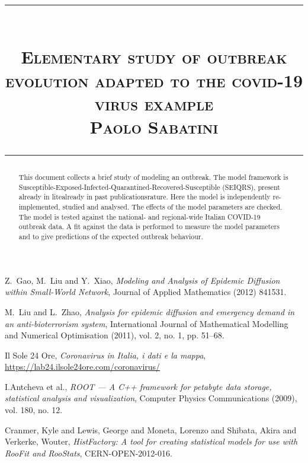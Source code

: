 \documentclass{article}
\title{
\begin{flushleft}
\rule{\textwidth}{1pt}\\
  \textsc{\textbf{Elementary study of outbreak evolution adapted to the covid-19 virus example 	}}\\[2mm]
\textsc{\large Paolo Sabatini}\\
\rule{\textwidth}{1pt}
  \end{flushleft}
}
\date{}
\begin{document}
\maketitle


\begin{abstract}
This document collects a brief study of modeling an outbreak. The model framework is Susceptible-Exposed-Infected-Quarantined-Recovered-Susceptible (SEIQRS), present already in litealready in past publicationsrature. Here the model is independently re-implemented, studied and analysed. The effects of the model parameters are checked. The model is tested against the national- and regional-wide Italian COVID-19 outbreak data. A fit against the data is performed to measure the model parameters and to give predictions of the expected outbreak behaviour.
\end{abstract}
\vspace{2cm}
\tableofcontents

\newpage







\begin{thebibliography}{9}
Z.~Gao, M.~Liu and Y.~Xiao, 
\textit{Modeling and Analysis of Epidemic Diffusion within Small-World Network},
Journal of Applied Mathematics (2012) 841531.

M.~Liu and L.~Zhao, 
\textit{Analysis for epidemic diffusion and emergency demand in an anti-bioterrorism
system},
International Journal of Mathematical Modelling and Numerical Optimisation (2011), vol. 2, no. 1, pp. 51–68.

Il Sole 24 Ore,
\textit{ 
Coronavirus in Italia, i dati e la mappa},
\href{https://lab24.ilsole24ore.com/coronavirus/}{https://lab24.ilsole24ore.com/coronavirus/}

I.Antcheva et al., 
\textit{ 
ROOT — A C++ framework for petabyte data storage, statistical analysis and visualization},
Computer Physics Communications (2009), vol. 180, no. 12.

Cranmer, Kyle and Lewis, George and Moneta, Lorenzo and Shibata, Akira and Verkerke, Wouter,
\textit{ 
HistFactory: A tool for creating statistical models for use with RooFit and RooStats},
CERN-OPEN-2012-016.


\end{thebibliography}
\end{document}
